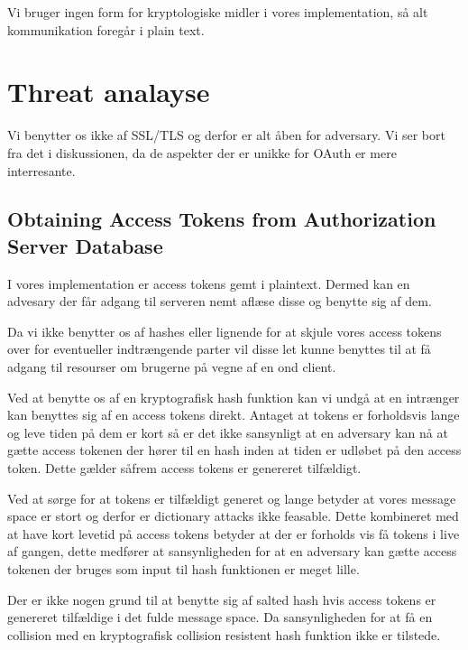 \documentclass[a4paper,12pt]{article}
\theoremstyle{plain}
\theoremstyle{nonumberplain}
\begin{document}
Vi bruger ingen form for kryptologiske midler i vores implementation, så alt kommunikation foregår i plain text.

\section*{Threat analayse}
Vi benytter os ikke af SSL/TLS og derfor er alt åben for adversary. Vi ser bort fra det i diskussionen, da de aspekter der er unikke for OAuth er mere interresante.

\subsection*{Obtaining Access Tokens from Authorization Server Database}
I vores implementation er access tokens gemt i plaintext. Dermed kan en advesary der får adgang til serveren nemt aflæse disse og benytte sig af dem.

Da vi ikke benytter os af hashes eller lignende for at skjule vores access tokens over for eventueller indtrængende parter vil disse let kunne benyttes til at få adgang til resourser om brugerne på vegne af en ond client.

Ved at benytte os af en kryptografisk hash funktion kan vi undgå at en intrænger kan benyttes sig af en access tokens direkt. Antaget at tokens er forholdsvis lange og leve tiden på dem er kort så er det ikke sansynligt at en adversary kan nå at gætte access tokenen der hører til en hash inden at tiden er udløbet på den access token. Dette gælder såfrem access tokens er genereret tilfældigt.

Ved at sørge for at tokens er tilfældigt generet og lange betyder at vores message space er stort og derfor er dictionary attacks ikke feasable. Dette kombineret med at have kort levetid på access tokens betyder at der er forholds vis få tokens i live af gangen, dette medfører at sansynligheden for at en adversary kan gætte access tokenen der bruges som input til hash funktionen er meget lille.

Der er ikke nogen grund til at benytte sig af salted hash hvis access tokens er genereret tilfældige i det fulde message space. Da sansynligheden for at få en collision med en kryptografisk collision resistent hash funktion ikke er tilstede.
\end{document}

